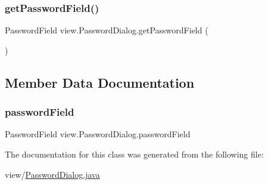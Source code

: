 \subsubsection{\texorpdfstring{get\+Password\+Field()}{getPasswordField()}}
{\footnotesize\ttfamily Password\+Field view.\+Password\+Dialog.\+get\+Password\+Field (\begin{DoxyParamCaption}{ }\end{DoxyParamCaption})}



\subsection{Member Data Documentation}
\mbox{\label{classview_1_1_password_dialog_a981d9b7d1f0586dca7ffe07421771b0b}} 
\subsubsection{\texorpdfstring{password\+Field}{passwordField}}
{\footnotesize\ttfamily Password\+Field view.\+Password\+Dialog.\+password\+Field\hspace{0.3cm}{\ttfamily [private]}}



The documentation for this class was generated from the following file\+:\begin{DoxyCompactItemize}
\item 
view/\mbox{\hyperlink{_password_dialog_8java}{Password\+Dialog.\+java}}\end{DoxyCompactItemize}
